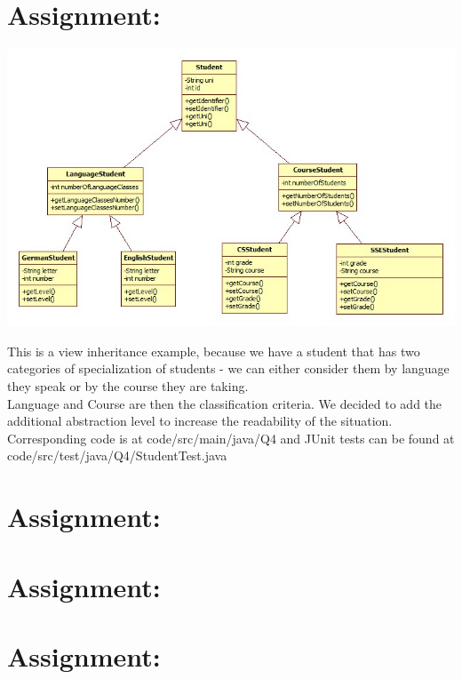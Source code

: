 \documentclass[a4paper,12pt,oneside]{scrreprt}
\begin{document}
	\section{Assignment:}

		\includegraphics[keepaspectratio,width=\textwidth,angle=0]{../uml/ClassDiagram4.jpg}\\
		\begin{flushleft}
			This is a view inheritance example, because we have a student that has two categories of specialization of students - we can either consider them by language they speak or by the course they are taking.\\
			Language and Course are then the classification criteria. We decided to add the additional abstraction level to increase the readability of the situation.\\
			Corresponding code is at code/src/main/java/Q4 and JUnit tests can be found at code/src/test/java/Q4/StudentTest.java
		\end{flushleft}
	\section{Assignment:}
		
  
  \section{Assignment:}
		
	\section{Assignment:}
	\section{}
	
	\section{}
	
\end{document}
